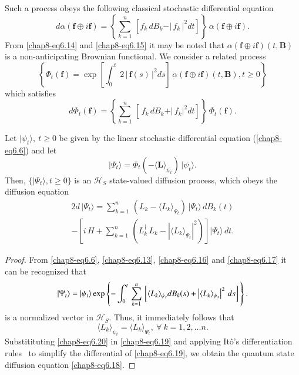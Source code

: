 Such a process obeys the following classical stochastic differential equation   
\begin{equation}
d\alpha(\mathbf{f}\oplus i\mathbf{f})=  \left\{\sum_{k=1}^{n}\,\left[ f_k\, dB_k-\vert\, f_k\,\vert^2 dt\right]\right\}\, \alpha(\mathbf{f}\oplus i\mathbf{f}).\label{chap8-eq6.15}
\end{equation}
From \eqref{chap8-eq6.14} and \eqref{chap8-eq6.15} it may be noted that $\alpha(\mathbf{f}\oplus i\mathbf{f})(t,\mathbf{B})$ is a  non-anticipating Brownian functional. We consider a related process 
$$\left\{\Phi_t(\mathbf{f}) = {\exp}\left[\int_0^t\, 2\,\vert\,\mathbf{f}(s)\,\vert^2 ds\right]\, \alpha(\mathbf{f}\oplus i \mathbf{f})(t,\mathbf{B}), t\geq 0\right\}$$ 
which satisfies 
\begin{equation}
d\Phi_t(\mathbf{f})= \left\{\sum_{k=1}^n\, \left[\, f_k\, dB_k+\vert\,f_k\vert^2 dt\right]\right\}\, \Phi_t(\mathbf{f}). \label{chap8-eq6.16}
\end{equation}

\begin{thm}\label{chap8-thm2}
Let $\vert\psi_t\rangle,\ t\geq 0$ be given by the linear stochastic differential equation (\ref{chap8-eq6.6}) and let  
\begin{equation}
\vert \Psi_t\rangle=\Phi_t(-\langle\mathbf{L}\rangle_{\psi_t})\, \vert\psi_t\rangle. \label{chap8-eq6.17}
\end{equation}
Then, $\{\vert \Psi_t\rangle, t\geq 0\}$ is an $\mathcal{H}_S$ state-valued diffusion process, which obeys the diffusion equation  
\begin{multline}{2}
d\,\vert\Psi_t\rangle = \sum_{k=1}^n\, (L_k-\langle L_k\rangle_{\Psi_t})\, \vert\Psi_t\rangle\, dB_k(t) \\
- \left[i\, H + \sum_{k=1}^n\, \left(L_k^\dag\, L_k-\left|\langle L_k\rangle_{\Psi_t} \right|^2 \right) \right] \vert\Psi_t\rangle\, dt. \label{chap8-eq6.18}
\end{multline}
\end{thm}

\begin{proof}
From \eqref{chap8-eq6.6}, \eqref{chap8-eq6.13}, \eqref{chap8-eq6.16} and \eqref{chap8-eq6.17} it can be recognized that   
\begin{equation}
\vert\Psi_t\rangle=\vert \psi_t\rangle\, {\rm exp}\left\{-\int_{0}^t\, \sum_{k=1}^n\, 
\left[\langle  L_k\rangle_{\psi_s} d B_k(s)+ \left|\langle  L_k\rangle_{\psi_s}\right|^2\, ds\right]\, \right\}. \label{chap8-eq6.19}
\end{equation} 
is a normalized vector in $\mathcal{H}_S$. Thus, it immediately follows that      
\begin{equation}
\langle L_k\rangle_{\psi_t}=\langle L_k\rangle_{\Psi_t},\ \forall\ k=1,2,\ldots n.\label{chap8-eq6.20}
\end{equation}
Substitituting \eqref{chap8-eq6.20} in \eqref{chap8-eq6.19}
and applying It{\^o}'s differentiation rules~\cite{chap8-key38} to simplify the differential of \eqref{chap8-eq6.19}, we obtain the quantum state diffusion equation \eqref{chap8-eq6.18}. 
\end{proof}

